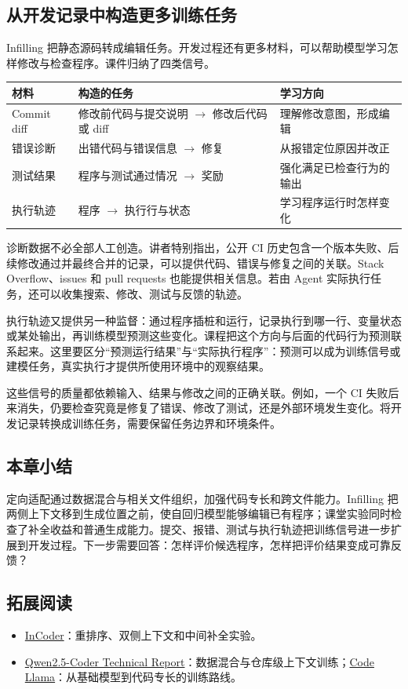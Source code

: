 \documentclass[11pt,a4paper]{article}
\begin{document}
\subsection{从开发记录中构造更多训练任务}
Infilling 把静态源码转成编辑任务。开发过程还有更多材料，可以帮助模型学习怎样修改与检查程序。课件归纳了四类信号。

\begin{center}
\small
\begin{tabularx}{\textwidth}{L{2.4cm}XX}
\toprule
材料 & 构造的任务 & 学习方向 \\
\midrule
Commit diff & 修改前代码与提交说明 $\rightarrow$ 修改后代码或 diff & 理解修改意图，形成编辑 \\
错误诊断 & 出错代码与错误信息 $\rightarrow$ 修复 & 从报错定位原因并改正 \\
测试结果 & 程序与测试通过情况 $\rightarrow$ 奖励 & 强化满足已检查行为的输出 \\
执行轨迹 & 程序 $\rightarrow$ 执行行与状态 & 学习程序运行时怎样变化 \\
\bottomrule
\end{tabularx}
\end{center}

诊断数据不必全部人工创造。讲者特别指出，公开 CI 历史包含一个版本失败、后续修改通过并最终合并的记录，可以提供代码、错误与修复之间的关联。Stack Overflow、issues 和 pull requests 也能提供相关信息。若由 Agent 实际执行任务，还可以收集搜索、修改、测试与反馈的轨迹。

执行轨迹又提供另一种监督：通过程序插桩和运行，记录执行到哪一行、变量状态或某处输出，再训练模型预测这些变化。课程把这个方向与后面的代码行为预测联系起来。这里要区分“预测运行结果”与“实际执行程序”：预测可以成为训练信号或建模任务，真实执行才提供所使用环境中的观察结果。

这些信号的质量都依赖输入、结果与修改之间的正确关联。例如，一个 CI 失败后来消失，仍要检查究竟是修复了错误、修改了测试，还是外部环境发生变化。将开发记录转换成训练任务，需要保留任务边界和环境条件。

\subsection{本章小结}
定向适配通过数据混合与相关文件组织，加强代码专长和跨文件能力。Infilling 把两侧上下文移到生成位置之前，使自回归模型能够编辑已有程序；课堂实验同时检查了补全收益和普通生成能力。提交、报错、测试与执行轨迹把训练信号进一步扩展到开发过程。下一步需要回答：怎样评价候选程序，怎样把评价结果变成可靠反馈？

\subsection{拓展阅读}
\begin{itemize}
\item \href{https://arxiv.org/abs/2204.05999}{InCoder}：重排序、双侧上下文和中间补全实验。
\item \href{https://arxiv.org/abs/2409.12186}{Qwen2.5-Coder Technical Report}：数据混合与仓库级上下文训练；\href{https://arxiv.org/abs/2308.12950}{Code Llama}：从基础模型到代码专长的训练路线。
\end{itemize}
\end{document}
